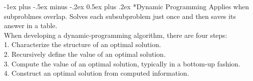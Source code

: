 \documentclass[10pt,landscape]{article}
\makeatletter
\renewcommand{\section}{\@startsection{section}{1}{0mm}%
                                {-1ex plus -.5ex minus -.2ex}%
                                {0.5ex plus .2ex}%
                                {\normalfont\large\bfseries}}
\makeatother
\begin{document}
\begin{multicols}{3}
\section*{Dynamic Programming}
\scriptsize{
Applies when subproblmes overlap. Solves each subsubproblem just once and then
saves its answer in a table.\\
When developing a dynamic-programming algorithm, there are four steps:\\
1. Characterize the structure of an optimal solution.\\
2. Recursively define the value of an optimal solution.\\
3. Compute the value of an optimal solution, typically in a bottom-up fashion.\\
4. Construct an optimal solution from computed information.
}


\end{multicols}
\end{document}
